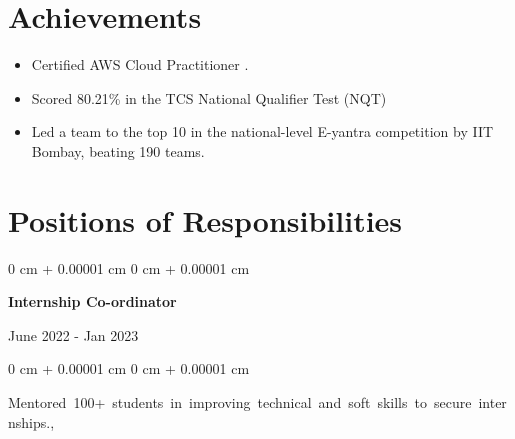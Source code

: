 \documentclass[10pt, letterpaper]{article}
\newenvironment{highlightsforbulletentries}{
    \begin{itemize}[
        topsep=0.10 cm,
        parsep=0.10 cm,
        partopsep=0pt,
        itemsep=0pt,
        leftmargin=10pt
    ]
}{
    \end{itemize}
} %
\newenvironment{onecolentry}{
    \begin{adjustwidth}{
        0 cm + 0.00001 cm
    }{
        0 cm + 0.00001 cm
    }
}{
    \end{adjustwidth}
} %
\newenvironment{twocolentry}[2][]{
    \onecolentry
    \def\secondColumn{#2}
    \setcolumnwidth{\fill, 4.5 cm}
    \begin{paracol}{2}
}{
    \switchcolumn \raggedleft \secondColumn
    \end{paracol}
    \endonecolentry
} %
\begin{document}
    
    \section{Achievements}
  
        \begin{highlightsforbulletentries}
            \item Certified AWS Cloud Practitioner .
            \item Scored 80.21\% in the TCS National Qualifier Test (NQT)
            \item Led a team to the top 10 in the national-level E-yantra competition by IIT Bombay, beating 190 teams.
        \end{highlightsforbulletentries}

    

    \section{Positions of Responsibilities}

        
        \begin{samepage}
            \begin{twocolentry}{
                June 2022 - Jan 2023
            }
                \textbf{Internship Co-ordinator}
            \end{twocolentry}

            \vspace{0.10 cm}
            
            \begin{onecolentry}
                \mbox{Mentored 100+ students in improving technical and soft skills to secure internships.}, 
                \vspace{0.10 cm}
                
        \end{onecolentry}
        \end{samepage}

    
\end{document}
